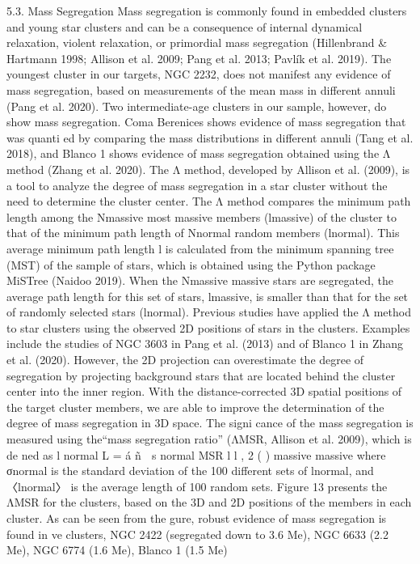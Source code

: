 \documentclass[../Main.tex]{subfiles}
\begin{document}
{%

5.3. Mass Segregation
Mass segregation is commonly found in embedded clusters
and young star clusters and can be a consequence of internal
dynamical relaxation, violent relaxation, or primordial mass
segregation (Hillenbrand & Hartmann 1998; Allison et al.
2009; Pang et al. 2013; Pavlík et al. 2019). The youngest
cluster in our targets, NGC 2232, does not manifest any
evidence of mass segregation, based on measurements of the
mean mass in different annuli (Pang et al. 2020). Two
intermediate-age clusters in our sample, however, do show
mass segregation. Coma Berenices shows evidence of mass
segregation that was quanti ed by comparing the mass
distributions in different annuli (Tang et al. 2018), and
Blanco 1 shows evidence of mass segregation obtained using
the Λ method (Zhang et al. 2020).
The Λ method, developed by Allison et al. (2009), is a tool
to analyze the degree of mass segregation in a star cluster
without the need to determine the cluster center. The Λ method
compares the minimum path length among the Nmassive most
massive members (lmassive) of the cluster to that of the
minimum path length of Nnormal random members (lnormal).
This average minimum path length l is calculated from the
minimum spanning tree (MST) of the sample of stars, which is
obtained using the Python package MiSTree (Naidoo 2019).
When the Nmassive massive stars are segregated, the average
path length for this set of stars, lmassive, is smaller than that for
the set of randomly selected stars (lnormal).
Previous studies have applied the Λ method to star clusters
using the observed 2D positions of stars in the clusters.
Examples include the studies of NGC 3603 in Pang et al.
(2013) and of Blanco 1 in Zhang et al. (2020). However, the 2D
projection can overestimate the degree of segregation by
projecting background stars that are located behind the cluster
center into the inner region. With the distance-corrected 3D
spatial positions of the target cluster members, we are able to
improve the determination of the degree of mass segregation in
3D space. The signi cance of the mass segregation is measured
using the“mass segregation ratio” (ΛMSR, Allison et al. 2009),
which is de ned as
l
normal
L = á ñ 
s
normal
MSR
l l , 2
( )
massive
massive
where σnormal is the standard deviation of the 100 different sets
of lnormal, and 〈lnormal〉 is the average length of 100 random sets.
Figure 13 presents the ΛMSR for the clusters, based on the 3D
and 2D positions of the members in each cluster. As can be
seen from the gure, robust evidence of mass segregation is
found in ve clusters, NGC 2422 (segregated down to 3.6 Me),
NGC 6633 (2.2 Me), NGC 6774 (1.6 Me), Blanco 1 (1.5 Me)

}
\end{document}
